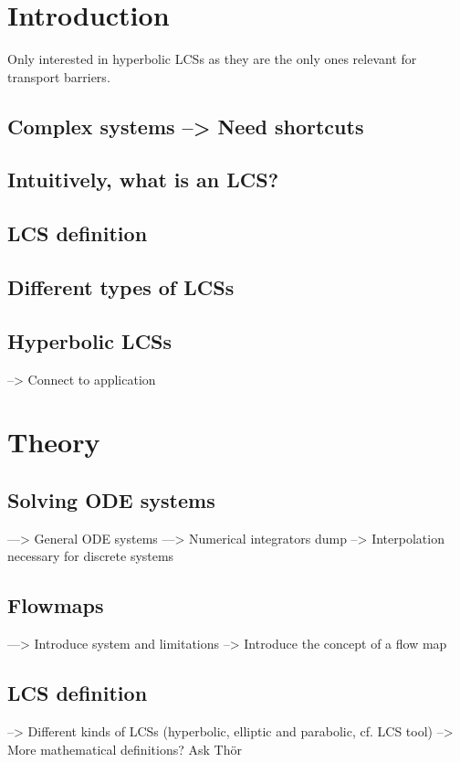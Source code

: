 \chapter{Introduction}
Only interested in hyperbolic LCSs as they are the only ones relevant for
transport barriers.

\section{Complex systems --> Need shortcuts}

\section{Intuitively, what is an LCS?}

\section{LCS definition}

\section{Different types of LCSs}

\section{Hyperbolic LCSs}
--> Connect to application

\chapter{Theory}
\section{Solving ODE systems}
---> General ODE systems
---> Numerical integrators dump
--> Interpolation necessary for discrete systems

\section{Flowmaps}
---> Introduce system and limitations
--> Introduce the concept of a flow map

\section{LCS definition}
--> Different kinds of LCSs (hyperbolic, elliptic and parabolic, cf. LCS tool)
--> More mathematical definitions? Ask Th{\"o}r

